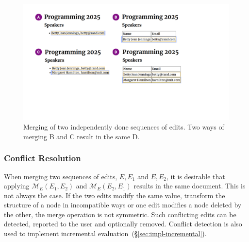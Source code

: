 \documentclass[sigconf,anonymous,screen]{acmart}
\begin{document}
\begin{figure}[t]
\includegraphics[width=0.95\columnwidth,clip,trim=1.7cm 6cm 7.8cm 1.5cm]{fig/merging.pdf}
\vspace{-0.5em}
\caption{Merging of two independently done sequences of edits. Two ways of merging B and C result in the same D.}
\label{fig:merging}
\vspace{-0.5em}
\end{figure}


\subsubsection*{Conflict Resolution}
When merging two sequences of edits, $E, E_1$ and $E, E_2$, it is desirable that
applying $\mathcal{M}_E(E_1, E_2)$ and $\mathcal{M}_E(E_2, E_1)$ results in the same document.
This is not always the case. If the two edits modify the same value, transform the structure of
a node in incompatible ways or one edit modifies a node deleted by the other, the merge operation
is not symmetric. Such conflicting edits can be detected, reported to the user and optionally
removed. Conflict detection is also used to implement incremental evaluation~(\S\ref{sec:impl-incremental}).

%
\end{document}
